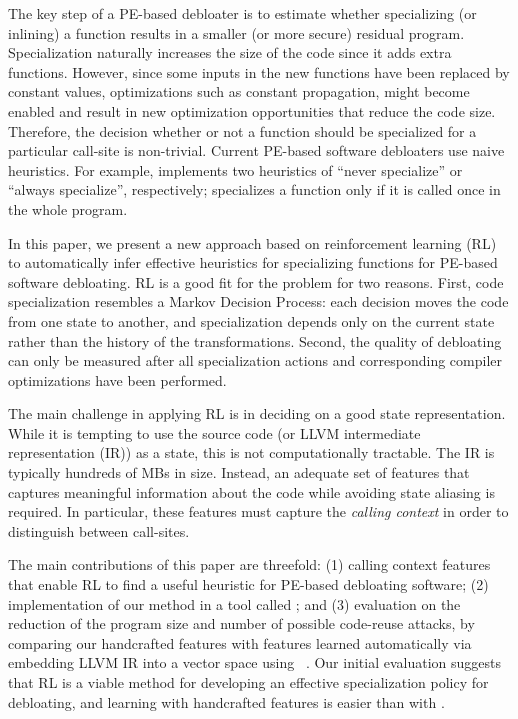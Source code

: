The key step of a PE-based debloater is to estimate whether specializing (or
inlining) a function results in a smaller (or more secure) residual program.
Specialization naturally increases the size of the code since it adds extra
functions. However, since some inputs in the new functions have been replaced by
constant values, optimizations such as constant propagation, might become
enabled and result in new optimization opportunities that reduce the code size.
Therefore, the decision whether or not a function should be specialized for a
particular call-site is non-trivial. %
Current PE-based software debloaters use naive heuristics. For example, \occam
implements two heuristics of ``never specialize'' or ``always specialize'',
respectively; \trimmer specializes a function only if it is called once in the
whole program. 

In this paper, we present a new approach based on reinforcement
learning (RL) to automatically infer effective heuristics for
specializing functions for PE-based software debloating. RL is a good
fit for the problem for two reasons. First, code specialization
resembles a Markov Decision Process: each decision moves the code from
one state to another, and specialization depends only on the current
state rather than the history of the transformations.  Second, the
quality of debloating can only be measured after all specialization
actions and corresponding compiler optimizations have been
performed. %

The main challenge in applying RL is in deciding on a good state
representation.  While it is tempting to use the source code (or LLVM
intermediate representation (IR)) as a state, this is not
computationally tractable. The IR is typically hundreds of MBs in
size. Instead, an adequate set of features that captures meaningful
information about the code while avoiding state aliasing is
required. In particular, these features must capture the \emph{calling context}
in order to distinguish between call-sites.

The main contributions of this paper are threefold: (1) calling
context features that enable RL to find a useful heuristic for
PE-based debloating software; (2) implementation of our method in a
tool called \doccam; and (3) evaluation on the reduction of the
program size and number of possible code-reuse attacks, by comparing
our handcrafted features with features learned automatically via
embedding LLVM IR into a vector space using \insttovec~\cite{inst2vec}.
%
Our initial evaluation suggests that RL is a viable method for
developing an effective specialization policy for debloating, and learning with
handcrafted features is easier than with \insttovec.

